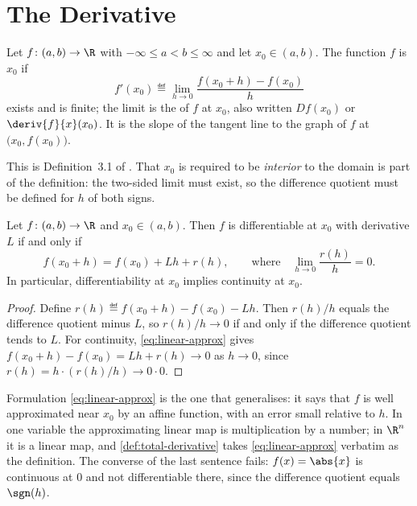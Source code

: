 \section{The Derivative}\label{sec:c1-derivative}

\begin{definition}[Derivative]\label{def:derivative}
	Let $f\colon(a,b)\to\R$ with $-\infty\leq a<b\leq\infty$ and let
	$x_0\in(a,b)$. The function $f$ is 
	$x_0$ if
	\[
		f'(x_0)\eqdef\lim_{h\to0}\frac{f(x_0+h)-f(x_0)}{h}
	\]
	exists and is finite; the limit is the  of $f$ at $x_0$, also
	written $Df(x_0)$ or $\deriv{f}{x}(x_0)$. It is the slope of the tangent line to
	the graph of $f$ at $\bigl(x_0,f(x_0)\bigr)$.
\end{definition}

This is Definition~3.1 of \textcite{fukuda2026notes}
\autocite[slide 4]{fukuda2026calculus}. That $x_0$ is required to be
\emph{interior} to the domain is part of the definition: the two-sided limit
must exist, so the difference quotient must be defined for $h$ of both signs.

\begin{proposition}\label{prop:diff-continuous}
	Let $f\colon(a,b)\to\R$ and $x_0\in(a,b)$. Then $f$ is differentiable at $x_0$
	with derivative $L$ if and only if
	\begin{equation}\label{eq:linear-approx}
		f(x_0+h)=f(x_0)+Lh+r(h),\qquad\text{where}\quad\lim_{h\to0}\frac{r(h)}{h}=0 .
	\end{equation}
	In particular, differentiability at $x_0$ implies continuity at $x_0$.
\end{proposition}

\begin{proof}
	Define $r(h)\eqdef f(x_0+h)-f(x_0)-Lh$. Then $r(h)/h$ equals the difference
	quotient minus $L$, so $r(h)/h\to0$ if and only if the difference quotient tends
	to $L$. For continuity, \eqref{eq:linear-approx} gives
	$f(x_0+h)-f(x_0)=Lh+r(h)\to0$ as $h\to0$, since $r(h)=h\cdot(r(h)/h)\to0\cdot0$.
\end{proof}

Formulation \eqref{eq:linear-approx} is the one that generalises: it says that
$f$ is well approximated near $x_0$ by an affine function, with an error small
relative to $h$. In one variable the approximating linear map is multiplication
by a number; in $\R^n$ it is a linear map, and \autoref{def:total-derivative}
takes \eqref{eq:linear-approx} verbatim as the definition. The converse of the
last sentence fails: $f(x)=\abs{x}$ is continuous at $0$ and not differentiable
there, since the difference quotient equals $\sgn(h)$.

